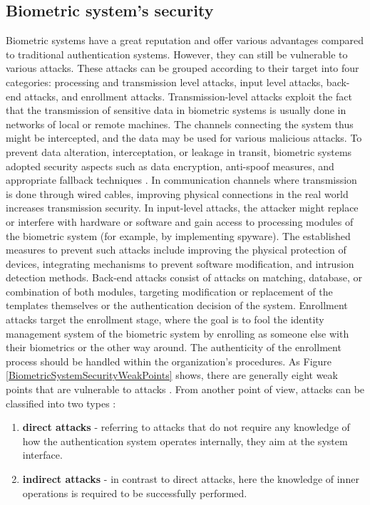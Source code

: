 \subsection{Biometric system's security}
\label{Biometric system's security}
Biometric systems have a great reputation and offer various advantages compared to traditional authentication systems. However, they can still be vulnerable to various attacks. These attacks can be grouped according to their target into four categories: processing and transmission level attacks, input level attacks, back-end attacks, and enrollment attacks\cite{BiometricAuthenticationVulnerabilities}. Transmission-level attacks exploit the fact that the transmission of sensitive data in biometric systems is usually done in networks of local or remote machines. The channels connecting the system thus might be intercepted, and the data may be used for various malicious attacks.
To prevent data alteration, interceptation, or leakage in transit, biometric systems adopted security aspects such as data encryption, anti-spoof measures, and appropriate fallback techniques \cite{BiometricAuthenticationVulnerabilities}. In communication channels where transmission is done through wired cables, improving physical connections in the real world increases transmission security. In input-level attacks, the attacker might replace or interfere with hardware or software and gain access to processing modules of the biometric system (for example, by implementing spyware). The established measures to prevent such attacks include improving the physical protection of devices, integrating mechanisms to prevent software modification, and intrusion detection methods\cite{IntrusionDetection}. Back-end attacks consist of attacks on matching, database, or combination of both modules, targeting modification or replacement of the templates themselves or the authentication decision of the system. Enrollment attacks target the enrollment stage, where the goal is to fool the identity management system of the biometric system by enrolling as someone else with their biometrics or the other way around. The authenticity of the enrollment process should be handled within the organization's procedures. As Figure \ref{BiometricSystemSecurityWeakPoints} shows, there are generally eight weak points that are vulnerable to attacks \cite{AttacksOnBiometrics}. From another point of view, attacks can be classified into two types \cite{AttacksOnBiometrics}:
\begin{enumerate}
    \item \textbf{direct attacks} - referring to attacks that do not require any knowledge of how the authentication system operates internally, they aim at the system interface.
    \item \textbf{indirect attacks} - in contrast to direct attacks, here the knowledge of inner operations is required to be successfully performed.
\end{enumerate}

